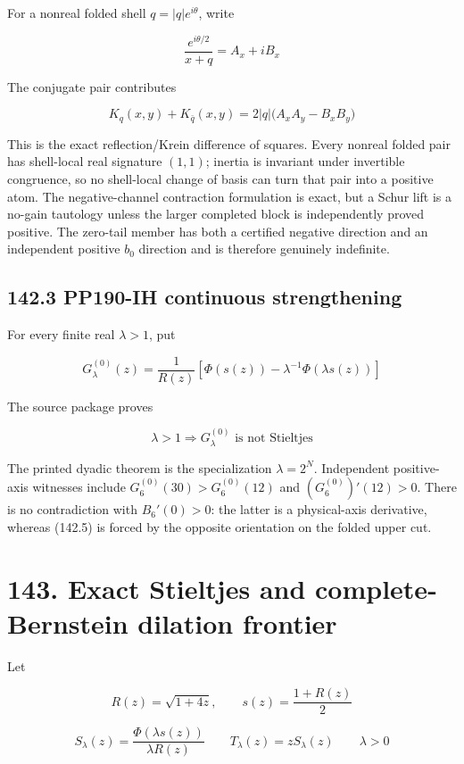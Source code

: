 \documentclass[
  11pt,
]{book}
\begin{document}
For a nonreal folded shell \(q=|q|e^{i\theta}\), write

\[
\frac{e^{i\theta/2}}{x+q}=A_x+iB_x
\]

The conjugate pair contributes

\[
\boxed{
K_q(x,y)+K_{\bar q}(x,y)
=2|q|\bigl(A_xA_y-B_xB_y\bigr)}
\tag{142.4}
\]

This is the exact reflection/Krein difference of squares. Every nonreal
folded pair has shell-local real signature \((1,1)\); inertia is
invariant under invertible congruence, so no shell-local change of basis
can turn that pair into a positive atom. The negative-channel
contraction formulation is exact, but a Schur lift is a no-gain
tautology unless the larger completed block is independently proved
positive. The zero-tail member has both a certified negative direction
and an independent positive \(b_0\) direction and is therefore genuinely
indefinite.

\subsection{142.3 PP190-IH continuous
strengthening}\label{pp190-ih-continuous-strengthening}

For every finite real \(\lambda>1\), put

\[
G_\lambda^{(0)}(z)
=\frac1{R(z)}
\left[\Phi(s(z))-\lambda^{-1}\Phi(\lambda s(z))\right]
\]

The source package proves

\[
\boxed{
\lambda>1\Longrightarrow
G_\lambda^{(0)}\text{ is not Stieltjes}}
\tag{142.5}
\]

The printed dyadic theorem is the specialization \(\lambda=2^N\).
Independent positive-axis witnesses include
\(G_6^{(0)}(30)>G_6^{(0)}(12)\) and \((G_6^{(0)})'(12)>0\). There is no
contradiction with \(B_6'(0)>0\): the latter is a physical-axis
derivative, whereas (142.5) is forced by the opposite orientation on the
folded upper cut.

\section{143. Exact Stieltjes and complete-Bernstein dilation
frontier}\label{exact-stieltjes-and-complete-bernstein-dilation-frontier}

Let

\[
R(z)=\sqrt{1+4z},\qquad
s(z)=\frac{1+R(z)}2
\]

\[
S_\lambda(z)=\frac{\Phi(\lambda s(z))}{\lambda R(z)}
\qquad
T_\lambda(z)=zS_\lambda(z)
\qquad \lambda>0
\]
\end{document}
